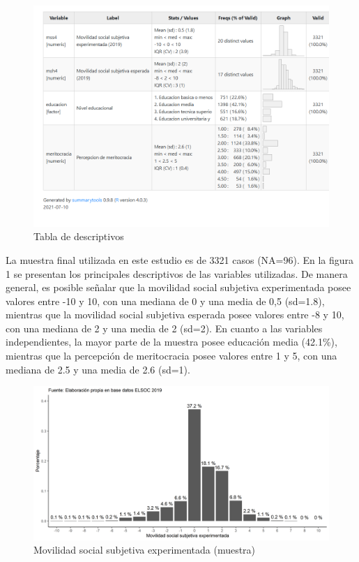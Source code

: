 \documentclass[
]{article}
\begin{document}
\begin{figure}

{\centering \includegraphics[width=1\linewidth,height=1\textheight]{output/tables/table1} 

}

\caption{Tabla de descriptivos}\label{fig:unnamed-chunk-6}
\end{figure}

La muestra final utilizada en este estudio es de 3321 casos (NA=96). En
la figura 1 se presentan los principales descriptivos de las variables
utilizadas. De manera general, es posible señalar que la movilidad
social subjetiva experimentada posee valores entre -10 y 10, con una
mediana de 0 y una media de 0,5 (sd=1.8), mientras que la movilidad
social subjetiva esperada posee valores entre -8 y 10, con una mediana
de 2 y una media de 2 (sd=2). En cuanto a las variables independientes,
la mayor parte de la muestra posee educación media (42.1\%), mientras
que la percepción de meritocracia posee valores entre 1 y 5, con una
mediana de 2.5 y una media de 2.6 (sd=1).

\begin{figure}

{\centering \includegraphics[width=0.8\linewidth,height=0.8\textheight]{output/graphs/graf1} 

}

\caption{Movilidad social subjetiva experimentada (muestra)}\label{fig:unnamed-chunk-7}
\end{figure}
\end{document}
